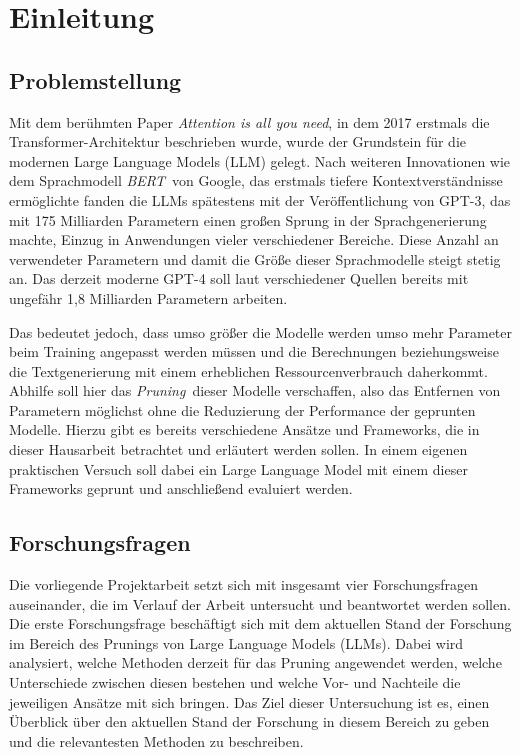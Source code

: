 \section{Einleitung}

\subsection{Problemstellung}

Mit dem berühmten Paper \emph{Attention is all you need}, in dem 2017 erstmals
die Transformer-Architektur beschrieben wurde, wurde der Grundstein für die
modernen Large Language Models (LLM) gelegt.
\autocite[Vlg.][]{vaswani2017attention} Nach weiteren Innovationen wie dem
Sprachmodell \emph{BERT} von Google, das erstmals tiefere Kontextverständnisse
ermöglichte\autocite[Vgl.][]{bertgoogle} fanden die LLMs spätestens mit der
Veröffentlichung von GPT-3, das mit 175 Milliarden Parametern einen großen
Sprung in der Sprachgenerierung machte, Einzug in Anwendungen vieler
verschiedener Bereiche.\autocite[Vgl.][]{gpt3} Diese Anzahl an verwendeter
Parametern und damit die Größe dieser Sprachmodelle steigt stetig an. Das
derzeit moderne GPT-4 soll laut verschiedener Quellen bereits mit ungefähr 1,8
Milliarden Parametern arbeiten.\autocite[Vgl.][]{gpt4size}

Das bedeutet jedoch, dass umso größer die Modelle werden umso mehr Parameter
beim Training angepasst werden müssen und die Berechnungen beziehungsweise die
Textgenerierung mit einem erheblichen Ressourcenverbrauch daherkommt. Abhilfe
soll hier das \emph{Pruning} dieser Modelle verschaffen, also das Entfernen von
Parametern möglichst ohne die Reduzierung der Performance der geprunten
Modelle.\autocite[Vgl.][]{llmpruner} Hierzu gibt es bereits verschiedene Ansätze
und Frameworks, die in dieser Hausarbeit betrachtet und erläutert werden sollen.
In einem eigenen praktischen Versuch soll dabei ein Large Language Model mit
einem dieser Frameworks geprunt und anschließend evaluiert werden.

\subsection{Forschungsfragen}

Die vorliegende Projektarbeit setzt sich mit insgesamt vier Forschungsfragen
auseinander, die im Verlauf der Arbeit untersucht und beantwortet werden sollen.
Die erste Forschungsfrage beschäftigt sich mit dem aktuellen Stand der Forschung
im Bereich des Prunings von Large Language Models (LLMs). Dabei wird analysiert,
welche Methoden derzeit für das Pruning angewendet werden, welche Unterschiede
zwischen diesen bestehen und welche Vor- und Nachteile die jeweiligen Ansätze
mit sich bringen. Das Ziel dieser Untersuchung ist es, einen Überblick über den
aktuellen Stand der Forschung in diesem Bereich zu geben und die relevantesten
Methoden zu beschreiben.

